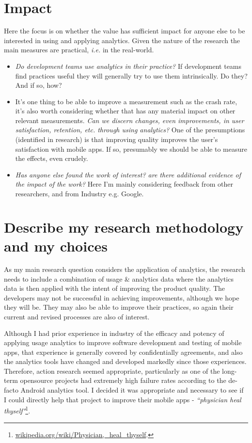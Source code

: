 \section{Impact}
Here the focus is on whether the value has sufficient impact for anyone else to be interested in using and applying analytics. Given the nature of the research the main measures are practical, \emph{i.e.} in the real-world.
\begin{itemize}
    \item \emph{Do development teams use analytics in their practice?} If development teams find practices useful they will generally try to use them intrinsically. Do they? And if so, how?
    \item It's one thing to be able to improve a measurement such as the crash rate, it's also worth considering whether that has any material impact on other relevant measurements. \emph{Can we discern changes, even improvements, in user satisfaction, retention, etc. through using analytics?} One of the presumptions (identified in research) is that improving quality improves the user's satisfaction with mobile apps. If so, presumably we should be able to measure the effects, even crudely.
    \item \emph{Has anyone else found the work of interest? are there additional evidence of the impact of the work?} Here I'm mainly considering feedback from other researchers, and from Industry e.g. Google.
\end{itemize}

\section{Describe my research methodology and my choices}
As my main research question considers the application of analytics, the research needs to include a combination of usage \& analytics data where the analytics data is then applied with the intent of improving the product quality. The developers may not be successful in achieving improvements, although we hope they will be. They may also be able to improve their practices, so again their current and revised processes are also of interest.

Although I had prior experience in industry of the efficacy and potency of applying usage analytics to improve software development and testing of mobile apps, that experience is generally covered by confidentially agreements, and also the analytics tools have changed and developed markedly since those experiences. Therefore, action research seemed appropriate, particularly as one of the long-term opensource projects had extremely high failure rates according to the de-facto Android analytics tool. I decided it was appropriate and necessary to see if I could directly help that project to improve their mobile apps - \emph{``physician heal thyself"}\footnote{\href{https://en.wikipedia.org/wiki/Physician,\_heal\_thyself}{wikipedia.org/wiki/Physician,\_heal\_thyself}.}.

